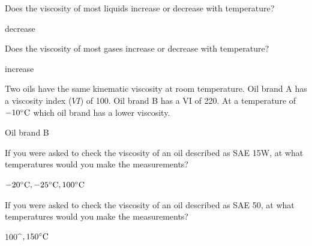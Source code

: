 \documentclass[multi,preview,varwidth=false,border=5,12pt]{standalone}
\begin{document}
\begin{question}

Does the viscosity of most liquids increase or decrease with temperature?

\begin{solution}
decrease
\end{solution}

\end{question}

\begin{question}

Does the viscosity of most gases increase or decrease with temperature?

\begin{solution}
increase
\end{solution}

\end{question}

\begin{question}

Two oils have the same kinematic viscosity at room temperature.  Oil brand A has a viscosity index ($VI$) of 100.  Oil brand B has a VI of 220.  At a temperature of $-10^\circ {\rm C}$ which oil brand has a lower viscosity.

\begin{solution}
Oil brand B
\end{solution}

\end{question}

\begin{question}

If you were asked to check the viscosity of an oil described as SAE 15W, at what temperatures would you make the measurements?

\begin{solution}
 $-20^\circ {\rm C}, -25^\circ {\rm C}, 100^\circ {\rm C}$
\end{solution}

\end{question}

\begin{question}

If you were asked to check the viscosity of an oil described as SAE 50, at what temperatures would you make the measurements?

\begin{solution}
100^$,  150^\circ {\rm C}$
\end{solution}

\end{question}
\end{document}
